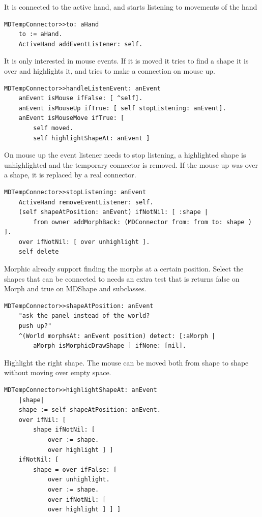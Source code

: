 \documentclass[10pt, twoside]{article}   	%
\begin{document}
It is connected to the active hand, and starts listening to
movements of the hand
\begin{verbatim}
MDTempConnector>>to: aHand
    to := aHand.
    ActiveHand addEventListener: self.
\end{verbatim}
It is only interested in mouse events. If it is moved it tries to find
a shape it is over and highlights it, and tries to make a connection 
on mouse up.
\begin{verbatim}
MDTempConnector>>handleListenEvent: anEvent
    anEvent isMouse ifFalse: [ ^self].
    anEvent isMouseUp ifTrue: [ self stopListening: anEvent]. 
    anEvent isMouseMove ifTrue: [ 
        self moved.
        self highlightShapeAt: anEvent ]
\end{verbatim}
On mouse up the event listener needs to stop listening, 
a highlighted shape is unhighlighted and the
temporary connector is removed. If the mouse up was over
a shape, it is replaced by a real connector.
\begin{verbatim}
MDTempConnector>>stopListening: anEvent
    ActiveHand removeEventListener: self.
    (self shapeAtPosition: anEvent) ifNotNil: [ :shape |
        from owner addMorphBack: (MDConnector from: from to: shape ) ].
    over ifNotNil: [ over unhighlight ].
    self delete
\end{verbatim}	
Morphic already support finding the morphs at a certain 
position. Select the shapes that can be connected to needs
an extra test that is returns false on Morph and true on
MDShape and subclasses.
\begin{verbatim}
MDTempConnector>>shapeAtPosition: anEvent
    "ask the panel instead of the world? 
    push up?"
    ^(World morphsAt: anEvent position) detect: [:aMorph |
        aMorph isMorphicDrawShape ] ifNone: [nil].
\end{verbatim}	
Highlight the right shape. The mouse can be moved 
both from shape to shape without moving over empty space.
\begin{verbatim}
MDTempConnector>>highlightShapeAt: anEvent
    |shape|
    shape := self shapeAtPosition: anEvent.
    over ifNil: [ 
        shape ifNotNil: [ 
            over := shape.
            over highlight ] ]
    ifNotNil: [ 
        shape = over ifFalse: [ 
            over unhighlight.
            over := shape.
            over ifNotNil: [  
            over highlight ] ] ]
\end{verbatim}	
\end{document}
